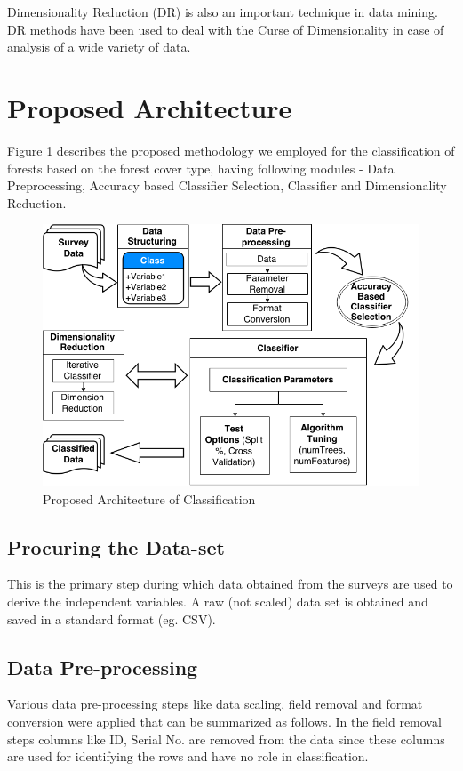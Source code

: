 \documentclass{llncs}
\begin{document}
Dimensionality Reduction (DR) is also an important technique in data mining. DR methods have been used to deal with the Curse of Dimensionality in case of analysis of a wide variety of data\cite{HuZahorian}\cite{Bostrom}.


\section{Proposed Architecture}

Figure \ref{framework} describes the proposed methodology we employed for the classification of forests based on the forest cover type, having following modules - Data Preprocessing, Accuracy based Classifier Selection, Classifier and Dimensionality Reduction.

\begin{figure}
  \centering
    \includegraphics[width=\textwidth]{framework.png}
  \caption{Proposed Architecture of Classification}
  \label{framework}
\end{figure}

\subsection{Procuring the Data-set}

This is the primary step during which data obtained from the surveys are used to derive the independent variables. A raw (not scaled) data set is obtained and saved in a standard format (eg. CSV).

\subsection{Data Pre-processing}
Various data pre-processing steps like data scaling, field removal and format conversion were applied that can be summarized as follows. In the field removal steps columns like ID, Serial No. are removed from the data since these columns are used for identifying the rows and have no role in classification.
\end{document}
